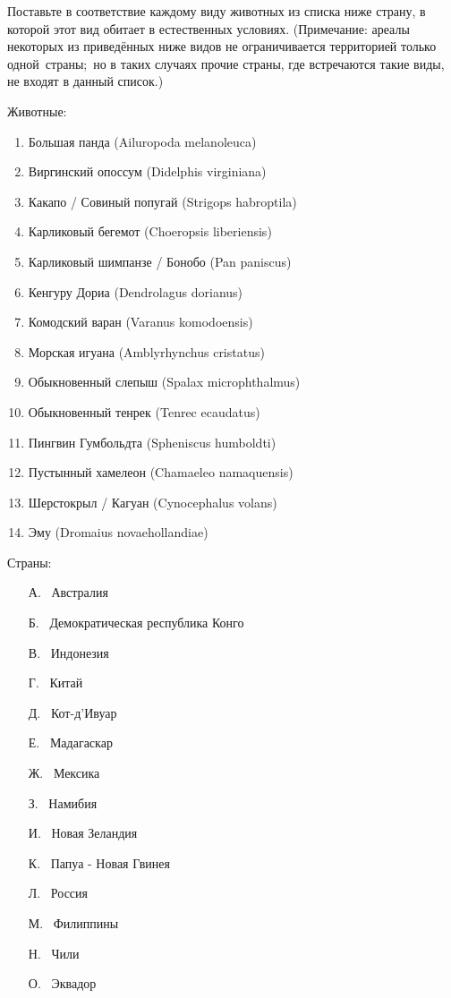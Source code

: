 
Поставьте в соответствие каждому виду животных из списка ниже страну, в которой этот вид обитает в естественных условиях. (Примечание: ареалы некоторых из приведённых ниже видов не ограничивается территорией только одной страны; но в таких случаях прочие страны, где встречаются такие виды, не входят в данный список.)

Животные:
\begin{enumerate}
    \item Большая панда (Ailuropoda melanoleuca)
    \item Виргинский опоссум (Didelphis virginiana)
    \item Какапо / Совиный попугай (Strigops habroptila)
    \item Карликовый бегемот (Choeropsis liberiensis)
    \item Карликовый шимпанзе / Бонобо (Pan paniscus)
    \item Кенгуру Дориа (Dendrolagus dorianus)
    \item Комодский варан (Varanus komodoensis)
    \item Морская игуана (Amblyrhynchus cristatus) 
    \item Обыкновенный слепыш (Spalax microphthalmus)
    \item Обыкновенный тенрек (Tenrec ecaudatus) 
    \item Пингвин Гумбольдта (Spheniscus humboldti)
    \item Пустынный хамелеон (Chamaeleo namaquensis)
    \item Шерстокрыл / Кагуан (Cynocephalus volans)
    \item Эму (Dromaius novaehollandiae)
\end{enumerate}

Страны:
\begin{enumerate}
    \item[А.] Австралия
    \item[Б.] Демократическая республика Конго
    \item[В.] Индонезия
    \item[Г.] Китай
    \item[Д.] Кот-д’Ивуар
    \item[Е.] Мадагаскар
    \item[Ж.] Мексика
    \item[З.] Намибия
    \item[И.] Новая Зеландия
    \item[К.] Папуа - Новая Гвинея
    \item[Л.] Россия 
    \item[М.] Филиппины
    \item[Н.] Чили
    \item[О.] Эквадор
\end{enumerate}

